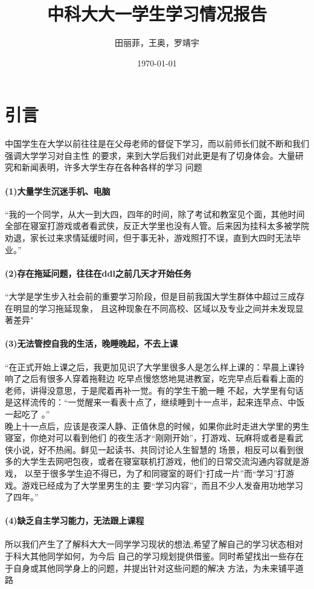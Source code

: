 \documentclass[UTF8]{ctexart}
\title{中科大大一学生学习情况报告}
\author{田丽菲，王奥，罗靖宇}
\date{\today}
\begin{document}
\maketitle


\section{引言}
中国学生在大学以前往往是在父母老师的督促下学习，而以前师长们就不断和我们强调大学学习对自主性
的要求，来到大学后我们对此更是有了切身体会。大量研究和新闻表明，许多大学生存在各种各样的学习
问题
\paragraph*{(1)大量学生沉迷手机、电脑}
“我的一个同学，从大一到大四，四年的时间，除了考试和教室见个面，其他时间全部在寝室打游戏或者看武侠，反正大学里也没有人管。后来因为挂科太多被学院劝退，家长过来求情延缓时间，但于事无补，游戏照打不误，直到大四时无法毕业。”\cite{game}
\paragraph*{(2)存在拖延问题，往往在ddl之前几天才开始任务}
“大学是学生步入社会前的重要学习阶段，但是目前我国大学生群体中超过三成存在明显的学习拖延现象，
且这种现象在不同高校、区域以及专业之间并未发现显著差异"\cite{delay}
\paragraph*{(3)无法管控自我的生活，晚睡晚起，不去上课}
“在正式开始上课之后，我更加见识了大学里很多人是怎么样上课的：早晨上课铃响了之后有很多人穿着拖鞋边
吃早点慢悠悠地晃进教室，吃完早点后看看上面的老师，讲{}得没意思，于是爬着再补一觉。有的学生干脆一睡
不起，大学里有句话是这样流传的：“一觉醒来一看表十点了，继续睡到十一点半，起来连早点、中饭一起吃了
。”\\
晚上十一点后，应该是夜深人静、正值休息的时候，如果你此时走进大学里的男生寝室，你绝对可以看到他们
的夜生活才“刚刚开始”，打游戏、玩麻将或者是看武侠小说，好不热闹。鲜见一起读书、共同讨论人生智慧的
场景，相反可以看到很多的大学生去网吧包夜，或者在寝室联机打游戏，他们的日常交流沟通内容就是游戏，
以至于很多学生迫不得已，为了和同寝室的哥们“打成一片”而“学习”打游戏。游戏已经成为了大学里男生的主
要“学习内容”，而且不少人发奋用功地学习了四年。”\cite{game}
\paragraph*{(4)缺乏自主学习能力，无法跟上课程}
\paragraph{}
所以我们产生了了解科大大一同学学习现状的想法,希望了解自己的学习状态相对于科大其他同学如何，为今后
自己的学习规划提供借鉴。同时希望找出一些存在于自身或其他同学身上的问题，并提出针对这些问题的解决
方法，为未来铺平道路
\end{document}
